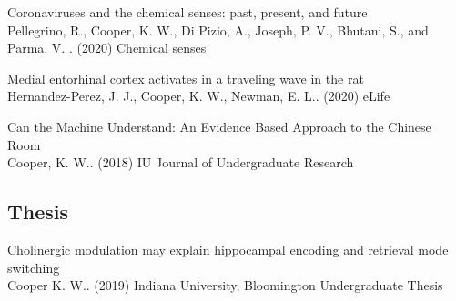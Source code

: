 \documentclass[10pt]{cooperCV2}
\begin{document}
\begin{etaremune}[resume,itemindent=-1.5\bibhang, topsep=0pt,
				   itemsep=\bibsep,partopsep=0pt,parsep=0pt,leftmargin={\bibhang+\widthof{[999]}}]
	
    \item Coronaviruses and the chemical senses: past, present, and future \\
     Pellegrino, R., Cooper, K. W., Di Pizio, A., Joseph, P. V., Bhutani, S., and Parma, V. . (2020) Chemical senses 
     
	
    \item Medial entorhinal cortex activates in a traveling wave in the rat \\
     Hernandez-Perez, J. J., Cooper, K. W., Newman, E. L.. (2020) eLife 
     
	
    \item Can the Machine Understand: An Evidence Based Approach to the Chinese Room \\
     Cooper, K. W.. (2018) IU Journal of Undergraduate Research 
     
	

\end{etaremune}

 

	

\subsection{Thesis} 
\begin{etaremune}[resume,itemindent=-1.5\bibhang, topsep=0pt,
				   itemsep=\bibsep,partopsep=0pt,parsep=0pt,leftmargin={\bibhang+\widthof{[999]}}] 
    
    \item Cholinergic modulation may explain hippocampal encoding and retrieval mode switching \\
     Cooper K. W.. (2019) Indiana University, Bloomington Undergraduate Thesis 
     
	

\end{etaremune}










%	





\end{document}
